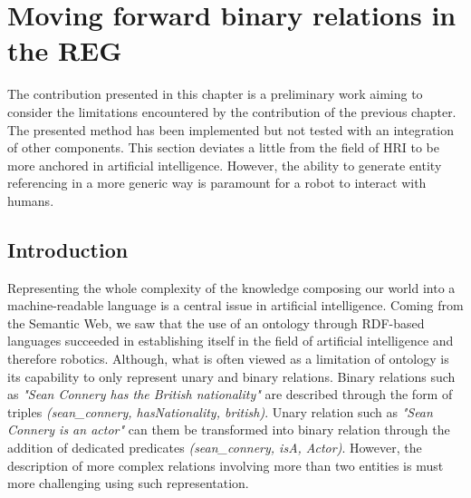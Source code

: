 \ifdefined{}
\else
\setcounter{chapter}{7} %
\dominitoc
\faketableofcontents
\fi

\chapter{Moving forward binary relations in the REG}
\minitoc
\label{chap:chap7}

The contribution presented in this chapter is a preliminary work aiming to consider the limitations encountered by the contribution of the previous chapter. The presented method has been implemented but not tested with an integration of other components. This section deviates a little from the field of HRI to be more anchored in artificial intelligence. However, the ability to generate entity referencing in a more generic way is paramount for a robot to interact with humans. 

\section{Introduction}

Representing the whole complexity of the knowledge composing our world into a machine-readable language is a central issue in artificial intelligence. Coming from the Semantic Web, we saw that the use of an ontology through RDF-based languages succeeded in establishing itself in the field of artificial intelligence and therefore robotics. Although, what is often viewed as a limitation of ontology is its capability to only represent unary and binary relations. Binary relations such as \textit{"Sean Connery has the British nationality"} are described through the form of triples \textit{(sean\_connery, hasNationality, british)}. Unary relation such as \textit{"Sean Connery is an actor"} can them be transformed into binary relation through the addition of dedicated predicates \textit{(sean\_connery, isA, Actor)}. However, the description of more complex relations involving more than two entities is must more challenging using such representation.

